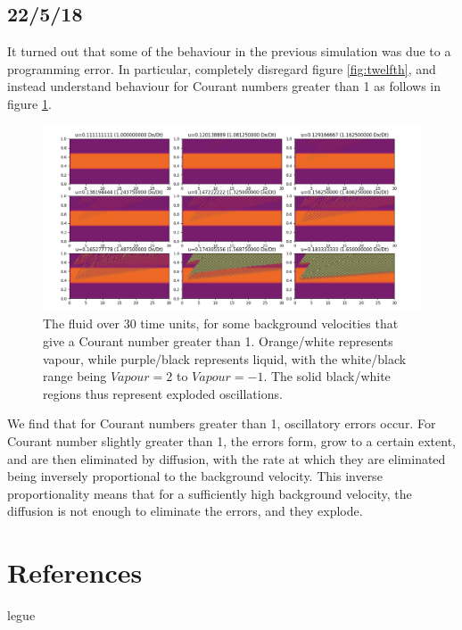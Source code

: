 \documentclass[11pt]{article}
\begin{document}
\subsection{22/5/18}
It turned out that some of the behaviour in the previous simulation was due to a programming error. In particular, completely disregard figure \ref{fig:twelfth}, and instead understand behaviour for Courant numbers greater than 1 as follows in figure \ref{fig:thirteenth}.
\begin{figure}[H]
\centering
\includegraphics[width=\textwidth]{thirteenth}
\caption{The fluid over 30 time units, for some background velocities that give a Courant number greater than 1. Orange/white represents vapour, while purple/black represents liquid, with the white/black range being $Vapour=2$ to $Vapour=-1$. The solid black/white regions thus represent exploded oscillations.}
\label{fig:thirteenth}
\end{figure}
\noindent We find that for Courant numbers greater than 1, oscillatory errors occur. For Courant number slightly greater than 1, the errors form, grow to a certain extent, and are then eliminated by diffusion, with the rate at which they are eliminated being inversely proportional to the background velocity. This inverse proportionality means that for a sufficiently high background velocity, the diffusion is not enough to eliminate the errors, and they explode.

\section{References}
legue
\end{document}
